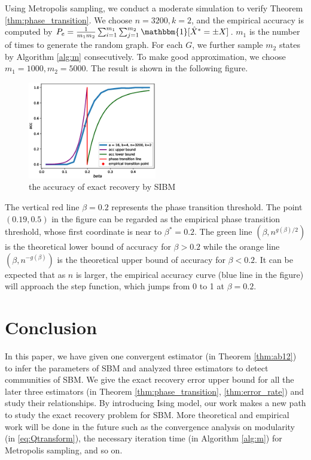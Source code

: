\documentclass[entropy,article,submit,moreauthors,pdftex]{Definitions/mdpi}
\newcommand{\1}{\mathbbm{1}}
\begin{document}
Using Metropolis sampling, we conduct a moderate simulation to verify Theorem \ref{thm:phase_transition}.
We choose $n=3200, k=2$, and the empirical accuracy is computed by $P_e = \frac{1}{m_1m_2}\sum_{i=1}^{m_1} \sum_{j=1}^{m_2} \mathbbm{1}[\hat{X}^* = \pm X]$. $m_1$ is the number of times to generate the random graph. For each $G$, we further sample $m_2$ states by Algorithm \ref{alg:m} consecutively.
To make good approximation, we choose $m_1=1000,m_2=5000$.
The result is shown in the following figure.
\begin{figure}[!ht]
		\centering
	\includegraphics[width=0.5\textwidth]{beta_trans-2020-11-13.eps}
	\caption{the accuracy of exact recovery by SIBM}
\end{figure}

The vertical red line $\beta=0.2$ represents the phase transition threshold. The point $(0.19,0.5)$ in the figure
can be regarded as the empirical phase transition threshold, whose first coordinate is near to $\beta^* = 0.2$.
The green line $(\beta, n^{g(\beta)/2})$ is the theoretical lower bound of accuracy for $\beta>0.2$ while the orange line
$(\beta, n^{-g(\beta)})$ is the theoretical upper bound of accuracy for $\beta < 0.2$. It can be expected that
as $n$ is larger, the empirical accuracy curve (blue line in the figure) will approach the step function, which jumps from
0 to 1 at $\beta=0.2$.
\section{Conclusion}
In this paper, we have given one convergent estimator (in Theorem \ref{thm:ab12}) to infer the parameters of SBM and analyzed three estimators to detect communities of SBM.
We give the exact recovery error upper bound for all the later three estimators (in Theorem \ref{thm:phase_transition}, \ref{thm:error_rate})
and study their relationships. By introducing Ising model, our work makes a new path to study the exact recovery problem for SBM. More
theoretical and empirical work will be done in the future such as the convergence analysis on modularity (in \eqref{eq:Qtransform}), the necessary iteration time (in Algorithm \ref{alg:m}) for Metropolis sampling, and so on.
\end{document}
